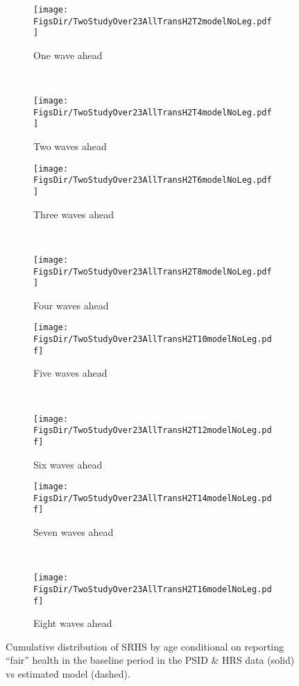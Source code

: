 \documentclass[12pt,pdftex,letterpaper]{article}
\newcommand{\RootDir}{..}
\newcommand{\FigsDir}{\RootDir/Figures}
\begin{document}
\begin{figure}
	\centering
	\begin{subfigure}[b]{0.45\textwidth}
		\texttt{[image: \\FigsDir/TwoStudyOver23AllTransH2T2modelNoLeg.pdf]}
		\caption{One wave ahead}\label{fig:Model1AheadFair}
	\end{subfigure}
	~
	\begin{subfigure}[b]{0.45\textwidth}
		\texttt{[image: \\FigsDir/TwoStudyOver23AllTransH2T4modelNoLeg.pdf]}
		\caption{Two waves ahead}\label{fig:Model2AheadFair}
	\end{subfigure}
	
	\begin{subfigure}[b]{0.45\textwidth}
		\texttt{[image: \\FigsDir/TwoStudyOver23AllTransH2T6modelNoLeg.pdf]}
		\caption{Three waves ahead}\label{fig:Model3AheadFair}
	\end{subfigure}
	~
	\begin{subfigure}[b]{0.45\textwidth}
		\texttt{[image: \\FigsDir/TwoStudyOver23AllTransH2T8modelNoLeg.pdf]}
		\caption{Four waves ahead}\label{fig:Model4AheadFair}
	\end{subfigure}
	
	\begin{subfigure}[b]{0.45\textwidth}
		\texttt{[image: \\FigsDir/TwoStudyOver23AllTransH2T10modelNoLeg.pdf]}
		\caption{Five waves ahead}\label{fig:Model5AheadFair}
	\end{subfigure}
	~
	\begin{subfigure}[b]{0.45\textwidth}
		\texttt{[image: \\FigsDir/TwoStudyOver23AllTransH2T12modelNoLeg.pdf]}
		\caption{Six waves ahead}\label{fig:Model6AheadFair}
	\end{subfigure}

	\begin{subfigure}[b]{0.45\textwidth}
		\texttt{[image: \\FigsDir/TwoStudyOver23AllTransH2T14modelNoLeg.pdf]}
		\caption{Seven waves ahead}\label{fig:Model7AheadFair}
	\end{subfigure}
	~
	\begin{subfigure}[b]{0.45\textwidth}
		\texttt{[image: \\FigsDir/TwoStudyOver23AllTransH2T16modelNoLeg.pdf]}
		\caption{Eight waves ahead}\label{fig:Model8AheadFair}
	\end{subfigure}
	\caption{Cumulative distribution of SRHS by age conditional on reporting ``fair'' health in the baseline period in the PSID \& HRS data (solid) vs estimated model (dashed).}\label{fig:ModelTransFR}
\end{figure}
\end{document}
